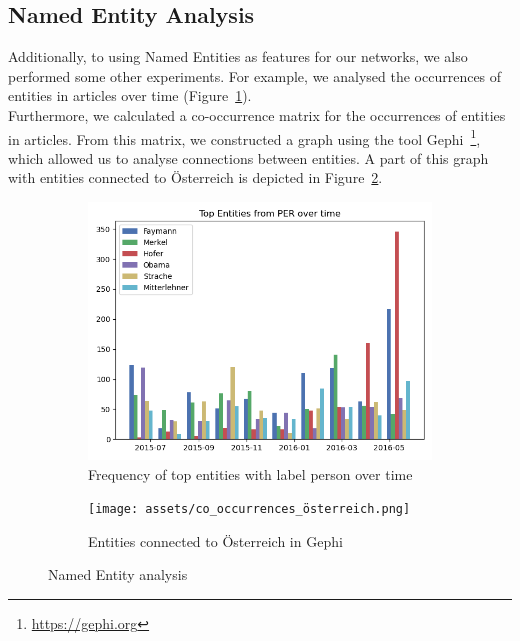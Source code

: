 \documentclass[acmsmall]{acmart}
\begin{document}
\subsection{Named Entity Analysis}
Additionally, to using Named Entities as features for our networks, we also performed some other experiments. For example, we analysed the occurrences of entities in articles over time (Figure~\ref{fig:per_entities_over_time}). \\ Furthermore, we calculated a co-occurrence matrix for the occurrences of entities in articles. From this matrix, we constructed a graph using the tool Gephi~\footnote{\url{https://gephi.org}}, which allowed us to analyse connections between entities. A part of this graph with entities connected to Österreich is depicted in Figure~\ref{fig:graph_cooccurrences_oesterreich}.

\begin{figure}[H]
\centering
\begin{subfigure}{.5\textwidth}
\centering
  \includegraphics[width=.9\linewidth]{assets/Top_Entities_from_PER_over_time.png} 
  \caption{Frequency of top entities with label person over time}
  \label{fig:per_entities_over_time}
 \end{subfigure}%
\begin{subfigure}{.5\textwidth}
\centering
  \texttt{[image: assets/co\_occurrences\_österreich.png]}
  \caption{Entities connected to Österreich in Gephi}
  \label{fig:graph_cooccurrences_oesterreich}
 \end{subfigure}
 \caption{Named Entity analysis}
\label{fig:ne_analysis}
\end{figure}



\pagebreak



\end{document}

